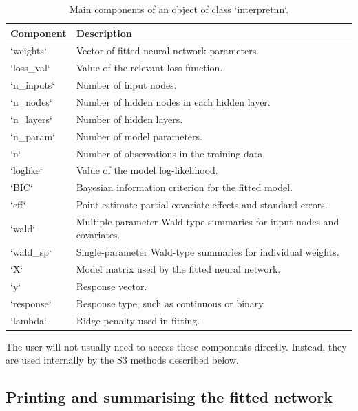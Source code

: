\begin{table}

\caption{\label{tab:interpretnn-components-table}Main components of an object of class `interpretnn`.}
\centering
\begin{tabular}[t]{l|l}
\hline
Component & Description\\
\hline
`weights` & Vector of fitted neural-network parameters.\\
\hline
`loss\_val` & Value of the relevant loss function.\\
\hline
`n\_inputs` & Number of input nodes.\\
\hline
`n\_nodes` & Number of hidden nodes in each hidden layer.\\
\hline
`n\_layers` & Number of hidden layers.\\
\hline
`n\_param` & Number of model parameters.\\
\hline
`n` & Number of observations in the training data.\\
\hline
`loglike` & Value of the model log-likelihood.\\
\hline
`BIC` & Bayesian information criterion for the fitted model.\\
\hline
`eff` & Point-estimate partial covariate effects and standard errors.\\
\hline
`wald` & Multiple-parameter Wald-type summaries for input nodes and covariates.\\
\hline
`wald\_sp` & Single-parameter Wald-type summaries for individual weights.\\
\hline
`X` & Model matrix used by the fitted neural network.\\
\hline
`y` & Response vector.\\
\hline
`response` & Response type, such as continuous or binary.\\
\hline
`lambda` & Ridge penalty used in fitting.\\
\hline
\end{tabular}
\end{table}

The user will not usually need to access these components directly.
Instead, they are used internally by the S3 methods described below.

\subsection{Printing and summarising the fitted network}\label{printing-and-summarising-the-fitted-network}

